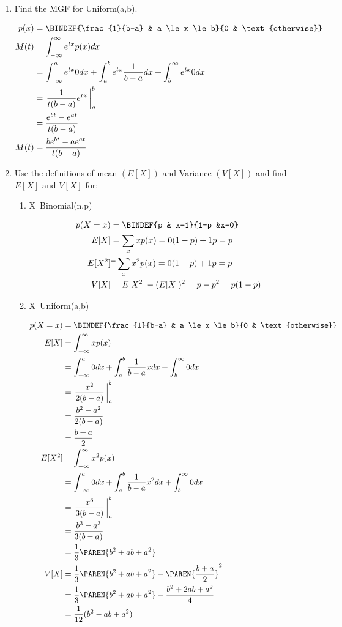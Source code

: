 \documentclass[10pt,a4paper]{report}
\newcommand{\BLUE}[1]{\textcolor{blue}{#1}}
\begin{document}
\begin{enumerate}
\newpage
	\item Find the MGF for Uniform(a,b).
	
	\BLUE{
	\begin{align*}
		p(x) &= \BINDEF{\frac{1}{b-a} & a \le x \le b}{0 & \text{otherwise}} \\
		M(t) &= \int_{-\infty}^\infty e^{tx}p(x)dx \\
		&= \int_{-\infty}^a e^{tx}0dx + \int_a^b e^{tx}\frac{1}{b-a} dx+\int_b^\infty e^{tx}0 dx \\
		&= \left . \frac{1}{t(b-a)}e^{tx} \, \right |_a^b \\
		&= \frac{e^{bt}-e^{at}}{t(b-a)} \\
		M(t) &= \frac{be^{bt}-ae^{at}}{t(b-a)} 
	\end{align*}
	}
	
	\newpage
	\item Use the definitions of mean $(E[X])$ and Variance $(V[X])$ and find $E[X]$ and $V[X]$ for:
	\begin{enumerate}
		\item X~Binomial(n,p)
		
		\BLUE{\begin{align*}
			p(X=x) &= \BINDEF{p & x=1}{1-p &x=0} \\
			E[X] &= \sum_x x p(x) = 0(1-p)+1p = p \\
			E[X^2] &^= \sum_x x^2 p(x) = 0(1-p)+1p = p \\
			V[X] &= E[X^2] - (E[X])^2 = p-p^2=p(1-p)
		\end{align*}
		}

		\item X~Uniform(a,b)
		
		\BLUE{\begin{align*}
			p(X=x) &= \BINDEF{\frac{1}{b-a} & a \le x \le b}{0 & \text{otherwise}} \\
			E[X] &= \int_{-\infty}^\infty x p(x) \\
			&= \int_{-\infty}^a 0dx + \int_a^b \frac{1}{b-a}x dx+\int_b^\infty 0 dx \\
		&= \left . \frac{x^2}{2(b-a)} \, \right |_a^b \\
		&= \frac{b^2-a^2}{2(b-a)} \\
		&= \frac{b+a}{2} \\
		E[X^2] &= \int_{-\infty}^\infty x^2 p(x) \\
			&= \int_{-\infty}^a 0dx + \int_a^b \frac{1}{b-a}x^2 dx+\int_b^\infty 0 dx \\
		&= \left . \frac{x^3}{3(b-a)} \, \right |_a^b \\
		&= \frac{b^3 - a^3}{3(b-a)} \\
		&= \frac{1}{3}\PAREN{b^2+ab+a^2} \\
		V[X] &= \frac{1}{3}\PAREN{b^2+ab+a^2} - \PAREN{\frac{b+a}{2}}^2 \\
		&= \frac{1}{3}\PAREN{b^2+ab+a^2} - \frac{b^2+2ab+a^2}{4} \\
		&= \frac{1}{12}(b^2-ab+a^2)
		\end{align*}
		}
	

\end{enumerate}
\end{enumerate}
\end{document}
